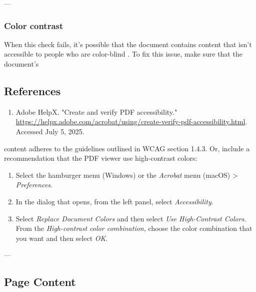 ---

\subsubsection{Color contrast}
\label{subsubsec:acrobat-color-contrast}
When this check fails, it's possible that the document contains content that isn't accessible to people who are color-blind \cite{AdobeHelpX}.
To fix this issue, make sure that the document's\vfill
\subsection{References}
\label{subsec:acrobat-references}
\begin{enumerate}
    \item Adobe HelpX. "Create and verify PDF accessibility." \url{https://helpx.adobe.com/acrobat/using/create-verify-pdf-accessibility.html}. Accessed July 5, 2025.
\end{enumerate}

content adheres to the guidelines outlined in WCAG section 1.4.3. Or, include a recommendation that the PDF viewer use high-contrast colors:
\begin{enumerate}
    \item Select the hamburger menu (Windows) or the \emph{Acrobat} menu (macOS) > \emph{Preferences}.
    \item In the dialog that opens, from the left panel, select \emph{Accessibility}.
    \item Select \emph{Replace Document Colors} and then select \emph{Use High-Contrast Colors}. From the \emph{High-contrast color combination}, choose the color combination that you want and then select \emph{OK}.
\end{enumerate}

---

\subsection{Page Content}
\label{subsec:acrobat-page-content}
